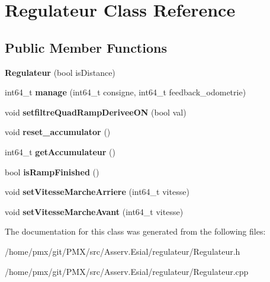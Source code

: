 \hypertarget{classRegulateur}{}\section{Regulateur Class Reference}
\label{classRegulateur}
\subsection*{Public Member Functions}
\begin{DoxyCompactItemize}
\item 
\mbox{\label{classRegulateur_a5e037b2d90393841445718a1b62da742}} 
{\bfseries Regulateur} (bool is\+Distance)
\item 
\mbox{\label{classRegulateur_a824837c778a972078f56343ab09b4288}} 
int64\+\_\+t {\bfseries manage} (int64\+\_\+t consigne, int64\+\_\+t feedback\+\_\+odometrie)
\item 
\mbox{\label{classRegulateur_a4ebdd9e34bfcb64bb267846675fa6438}} 
void {\bfseries setfiltre\+Quad\+Ramp\+Derivee\+ON} (bool val)
\item 
\mbox{\label{classRegulateur_a85dd2909cd92c084a14f371874114d74}} 
void {\bfseries reset\+\_\+accumulator} ()
\item 
\mbox{\label{classRegulateur_aee02d0cfa54e00a88c37272d5614c254}} 
int64\+\_\+t {\bfseries get\+Accumulateur} ()
\item 
\mbox{\label{classRegulateur_a40920ba18bc022567522c949a1c64020}} 
bool {\bfseries is\+Ramp\+Finished} ()
\item 
\mbox{\label{classRegulateur_a06313e540837f06ce6af423ec1bc5626}} 
void {\bfseries set\+Vitesse\+Marche\+Arriere} (int64\+\_\+t vitesse)
\item 
\mbox{\label{classRegulateur_a2ff448df709ced156a40407d0107f31d}} 
void {\bfseries set\+Vitesse\+Marche\+Avant} (int64\+\_\+t vitesse)
\end{DoxyCompactItemize}


The documentation for this class was generated from the following files\+:\begin{DoxyCompactItemize}
\item 
/home/pmx/git/\+P\+M\+X/src/\+Asserv.\+Esial/regulateur/Regulateur.\+h\item 
/home/pmx/git/\+P\+M\+X/src/\+Asserv.\+Esial/regulateur/Regulateur.\+cpp\end{DoxyCompactItemize}
